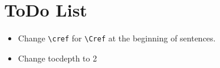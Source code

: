 \chapter*{ToDo List}

\begin{itemize}
    \tightlist
    \item Change \verb|\cref| for \verb|\Cref| at the beginning of sentences.
    \item Change tocdepth to 2
\end{itemize}